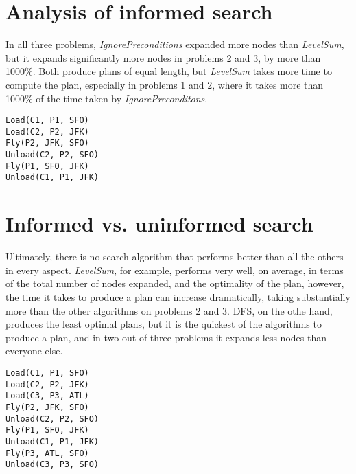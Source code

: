 \documentclass[10pt,a4paper]{article}
\begin{document}
\section*{Analysis of informed search}

In all three problems, \textit{IgnorePreconditions} expanded more nodes than
\textit{LevelSum}, but it expands significantly more nodes in problems 2 and 3,
by more than 1000\%. Both produce plans of equal length, but \textit{LevelSum}
takes more time to compute the plan, especially in problems 1 and 2, where
it takes more than 1000\% of the time taken by \textit{IgnorePreconditons}.

\begin{mdframed}[frametitle={Problem 1: Optimal Plan},
                 backgroundcolor=light-grey, roundcorner=10pt,
                 leftmargin=1, rightmargin=1,
                 innerleftmargin=15, innerrightmargin=15,
                 innertopmargin=15, innerbottommargin=15,
                 outerlinewidth=1, linecolor=light-grey]
\begin{lstlisting}
Load(C1, P1, SFO)
Load(C2, P2, JFK)
Fly(P2, JFK, SFO)
Unload(C2, P2, SFO)
Fly(P1, SFO, JFK)
Unload(C1, P1, JFK)
\end{lstlisting}
\end{mdframed}

\section*{Informed vs. uninformed search}

Ultimately, there is no search algorithm that performs better than all the
others in every aspect. \textit{LevelSum}, for example, performs very well,
on average, in terms of the total number of nodes expanded, and the optimality
of the plan, however, the time it takes to produce a plan can increase
dramatically, taking substantially more than the other algorithms on problems
2 and 3. DFS, on the othe hand, produces the least optimal plans, but it is the
quickest of the algorithms to produce a plan, and in two out of three problems
it expands less nodes than everyone else.

\begin{mdframed}[frametitle={Problem 2: Optimal Plan},
                 backgroundcolor=light-grey, roundcorner=10pt,
                 leftmargin=1, rightmargin=1,
                 innerleftmargin=15, innerrightmargin=15,
                 innertopmargin=15, innerbottommargin=15,
                 outerlinewidth=1, linecolor=light-grey]
\begin{lstlisting}
Load(C1, P1, SFO)
Load(C2, P2, JFK)
Load(C3, P3, ATL)
Fly(P2, JFK, SFO)
Unload(C2, P2, SFO)
Fly(P1, SFO, JFK)
Unload(C1, P1, JFK)
Fly(P3, ATL, SFO)
Unload(C3, P3, SFO)
\end{lstlisting}
\end{mdframed}
\end{document}
